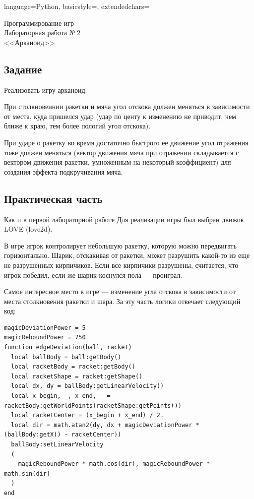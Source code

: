 \documentclass[12pt]{article}
\newcommand{\StudentName}{Ильвохин Дмитрий}
\newcommand{\Group}{1O-106М}
\newcommand{\CourseName}{Программирование игр}
\newcommand{\LabNum}{2}
\newcommand{\Subject}{Арканоид}
\begin{document}

\lstset
{
        language=Python,
        basicstyle=\footnotesize,%
        extendedchars=\true
}

\begin{flushright}
\Large{
	\CourseName \\
	Лабораторная работа №\,\LabNum \\
	<<\Subject>> \\
}
\end{flushright}

\subsection*{Задание}
Реализовать игру арканоид.

При столкновеинии ракетки и мяча угол отскока должен меняться в зависимости от места,
куда пришелся удар (удар по центу к изменению не приводит, чем ближе к краю,
тем более пологий угол отскока).

При ударе о ракетку во время достаточно быстрого ее движение угол отражения тоже должен меняться
(вектор движения мяча при отражении складывается с вектором движения ракетки, 
умноженным на некоторый коэффициент) для создания эффекта подкручивания мяча.

\subsection*{Практическая часть}
Как и в первой лабораторной работе Для реализации игры был выбран движок LÖVE (love2d).

В игре игрок контролирует небольшую ракетку, которую можно передвигать горизонтально.
Шарик, отскакивая от ракетки, может разрушить какой-то из еще не разрушенных кирпичиков.
Если все кирпичики разрушены, считается, что игрок победил, если же шарик коснулся пола ---
проиграл.

Самое интересное место в игре --- изменение угла отскока в зависимости от места
столкновения ракетки и шара. За эту часть логики отвечает следующий код:

\begin{lstlisting}
magicDeviationPower = 5
magicReboundPower = 750
function edgeDeviation(ball, racket)
  local ballBody = ball:getBody()
  local racketBody = racket:getBody()
  local racketShape = racket:getShape()
  local dx, dy = ballBody:getLinearVelocity()
  local x_begin, _, x_end, _ = racketBody:getWorldPoints(racketShape:getPoints())
  local racketCenter = (x_begin + x_end) / 2.
  local dir = math.atan2(dy, dx + magicDeviationPower * (ballBody:getX() - racketCenter))
  ballBody:setLinearVelocity
  (
    magicReboundPower * math.cos(dir), magicReboundPower * math.sin(dir)
  )
end
\end{lstlisting}
\end{document}
